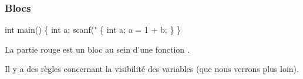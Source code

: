 \begin{frame}[fragile]\frametitle{Blocs}
\begin{multicols}{2}
\begin{semiverbatim}\footnotesize
int main() \{
    int a;
    scanf("%
    \textcolor{BrickRed}{\{
        int a;
        a = 1 + b;
    \}}
\}
\end{semiverbatim}

La partie rouge est un bloc au sein d'une fonction .
\bigskip

Il y a des règles concernant la visibilité des variables (que nous
verrons plus loin).
\bigskip
\bigskip
\bigskip
\bigskip
\end{multicols}
\bigskip

\begin{multicols}{2}
\begin{semiverbatim}\footnotesize{}
\end{semiverbatim}
\end{multicols}
\end{frame}

